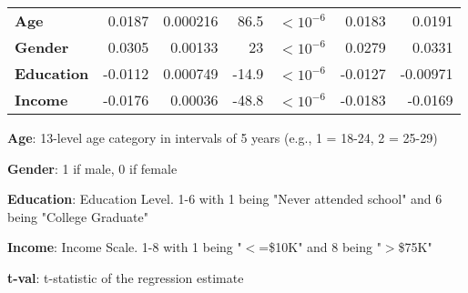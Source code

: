 \documentclass[11pt]{article}
\begin{document}
\begin{table}[h]
\begin{threeparttable}
{\begin{tabular}{lrrrlrr}
\textbf{Age} & \raisebox{2ex}{\hypertarget{B5a}{}}0.0187 & \raisebox{2ex}{\hypertarget{B5b}{}}0.000216 & \raisebox{2ex}{\hypertarget{B5c}{}}86.5 & $<$\raisebox{2ex}{\hypertarget{B5d}{}}$10^{-6}$ & \raisebox{2ex}{\hypertarget{B5e}{}}0.0183 & \raisebox{2ex}{\hypertarget{B5f}{}}0.0191 \\
\textbf{Gender} & \raisebox{2ex}{\hypertarget{B6a}{}}0.0305 & \raisebox{2ex}{\hypertarget{B6b}{}}0.00133 & \raisebox{2ex}{\hypertarget{B6c}{}}23 & $<$\raisebox{2ex}{\hypertarget{B6d}{}}$10^{-6}$ & \raisebox{2ex}{\hypertarget{B6e}{}}0.0279 & \raisebox{2ex}{\hypertarget{B6f}{}}0.0331 \\
\textbf{Education} & \raisebox{2ex}{\hypertarget{B7a}{}}-0.0112 & \raisebox{2ex}{\hypertarget{B7b}{}}0.000749 & \raisebox{2ex}{\hypertarget{B7c}{}}-14.9 & $<$\raisebox{2ex}{\hypertarget{B7d}{}}$10^{-6}$ & \raisebox{2ex}{\hypertarget{B7e}{}}-0.0127 & \raisebox{2ex}{\hypertarget{B7f}{}}-0.00971 \\
\textbf{Income} & \raisebox{2ex}{\hypertarget{B8a}{}}-0.0176 & \raisebox{2ex}{\hypertarget{B8b}{}}0.00036 & \raisebox{2ex}{\hypertarget{B8c}{}}-48.8 & $<$\raisebox{2ex}{\hypertarget{B8d}{}}$10^{-6}$ & \raisebox{2ex}{\hypertarget{B8e}{}}-0.0183 & \raisebox{2ex}{\hypertarget{B8f}{}}-0.0169 \\
\bottomrule
\end{tabular}}
\begin{tablenotes}
\footnotesize
\item \textbf{Age}: 13-level age category in intervals of 5 years (e.g., 1 = 18-24, 2 = 25-29)
\item \textbf{Gender}: 1 if male, 0 if female
\item \textbf{Education}: Education Level. 1-6 with 1 being "Never attended school" and 6 being "College Graduate"
\item \textbf{Income}: Income Scale. 1-8 with 1 being "$<$=\$10K" and 8 being "$>$\$75K"
\item \textbf{t-val}: t-statistic of the regression estimate

\end{tablenotes}
\end{threeparttable}
\end{table}
\end{document}

